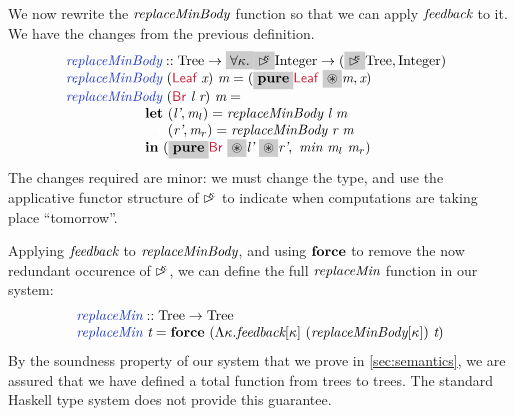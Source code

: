 We now rewrite the $\textit{replaceMinBody}$ function so that we can
apply $\textit{feedback}$ to it. We have  the
changes from the previous definition.
\begin{displaymath}
  \begin{array}{@{}l}
    \defn{replaceMinBody} :: \tyname{Tree} \to \hlchangem{\forall \kappa.}\hlchangem{\delay\kappa}\tyname{Integer} \to (\hlchangem{\delay\kappa}\tyname{Tree},\tyname{Integer}) \\
    \hspace{0cm} \defn{replaceMinBody}\ (\cons{Leaf}\ \ident{x})\ \ident{m} = (\hlchangem{\kw{pure}}\cons{Leaf}\ \hlchangem{\circledast}\ident{m}, \ident{x}) \\
    \hspace{0cm} \defn{replaceMinBody}\ (\cons{Br}\ \ident{l}\ \ident{r})\ \ident{m} = \\
    \hspace{2cm} \kw{let}\ (\ident{l'}, \ident{m$_l$}) = \ident{replaceMinBody}\ \ident{l}\ \ident{m} \\
    \hspace{2cm} \textcolor{white}{\kw{let}\ }(\ident{r'}, \ident{m$_r$}) = \ident{replaceMinBody}\ \ident{r}\ \ident{m} \\
    \hspace{2cm} \kw{in}\ (\hlchangem{\kw{pure}}\cons{Br}\ \hlchangem{\circledast}\ident{l'}\ \hlchangem{\circledast}\ident{r'},\ \ident{min}\ \ident{m$_l$}\ \ident{m$_r$})
  \end{array}
\end{displaymath}
The changes required are minor: we must change the type, and use the
applicative functor structure of $\mathord{\rhd\kern-0.4em^{\kappa}}$ to indicate when
computations are taking place ``tomorrow''.

Applying $\textit{feedback}$ to $\textit{replaceMinBody}$, and using
$\textbf{force}$ to remove the now redundant occurence of $\mathord{\rhd\kern-0.4em^{\kappa}}$,
we can define the full $\textit{replaceMin}$ function in our system:
\begin{displaymath}
  \begin{array}{l}
    \defn{replaceMin} :: \tyname{Tree} \to \tyname{Tree} \\
    \defn{replaceMin}\ \ident{t} = \kw{force}\ (\Lambda \kappa. \ident{feedback}[\kappa]\ (\ident{replaceMinBody}[\kappa])\ \ident{t})
  \end{array}
\end{displaymath}
By the soundness property of our system that we prove in
\autoref{sec:semantics}, we are assured that we have defined a total
function from trees to trees. The standard Haskell type system does
not provide this guarantee.

